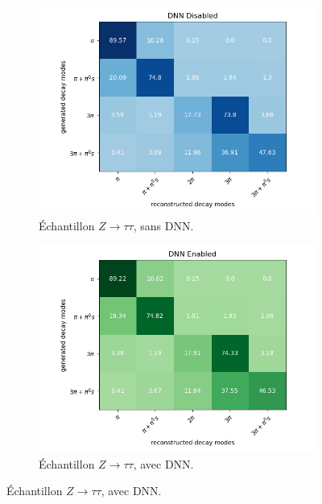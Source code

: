 \begin{figure}[!ht]
  \begin{subfigure}{0.5\linewidth}
    \centering
    \includegraphics[width=1\linewidth]{Chapitre4/Images/DMmatrices/Matrix_DNNDisabled.png} 
    \caption{Échantillon $Z\rightarrow\tau\tau$, sans DNN.}
    \vspace{0.5ex}
  \end{subfigure}
  \begin{subfigure}{0.5\linewidth}
    \centering
    \includegraphics[width=1\linewidth]{Chapitre4/Images/DMmatrices/Matrix_DNNEnabled.png} 
    \caption{Échantillon $Z\rightarrow\tau\tau$, avec DNN.}
    \vspace{0.5ex}
  \end{subfigure} 

\end{figure}
